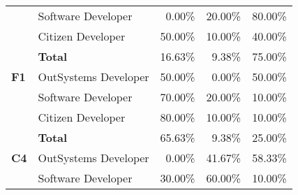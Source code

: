 \begin{table}[tb]
\begin{tabular}{@{}llrrr@{}}
                              & Software Developer   & 0.00\%                                                            & 20.00\%                                                                 & 80.00\%                                                       \\
                              & Citizen Developer    & 50.00\%                                                           & 10.00\%                                                                 & 40.00\%                                                       \\
                              & \textbf{Total}       & 16.63\%                                                           & 9.38\%                                                                  & 75.00\%                                                       \\ \midrule
    \textbf{F1}               & OutSystems Developer & 50.00\%                                                           & 0.00\%                                                                  & 50.00\%                                                       \\
                              & Software Developer   & 70.00\%                                                           & 20.00\%                                                                 & 10.00\%                                                       \\
                              & Citizen Developer    & 80.00\%                                                           & 10.00\%                                                                 & 10.00\%                                                       \\
                              & \textbf{Total}       & 65.63\%                                                           & 9.38\%                                                                  & 25.00\%                                                       \\ \midrule
    \textbf{C4}               & OutSystems Developer & 0.00\%                                                            & 41.67\%                                                                 & 58.33\%                                                       \\
                              & Software Developer   & 30.00\%                                                           & 60.00\%                                                                 & 10.00\%                                                       \\

\end{tabular}
\end{table}

